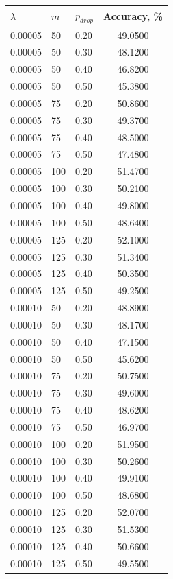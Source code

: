 \documentclass{article}
\begin{document}
\newpage
	\begin{center}	
	\begin{tabular}{|l|l|l|c|}
		\hline
		 $\lambda$ & $m$ & $p_{drop}$ & Accuracy, \% \\\hline
		0.00005 & 50 & 0.20 & 49.0500 \\
		0.00005 & 50 & 0.30 & 48.1200 \\
		0.00005 & 50 & 0.40 & 46.8200 \\
		0.00005 & 50 & 0.50 & 45.3800 \\
		0.00005 & 75 & 0.20 & 50.8600 \\
		0.00005 & 75 & 0.30 & 49.3700 \\
		0.00005 & 75 & 0.40 & 48.5000 \\
		0.00005 & 75 & 0.50 & 47.4800 \\
		0.00005 & 100 & 0.20 & 51.4700 \\
		0.00005 & 100 & 0.30 & 50.2100 \\
		0.00005 & 100 & 0.40 & 49.8000 \\
		0.00005 & 100 & 0.50 & 48.6400 \\
		0.00005 & 125 & 0.20 & 52.1000 \\
		0.00005 & 125 & 0.30 & 51.3400 \\
		0.00005 & 125 & 0.40 & 50.3500 \\
		0.00005 & 125 & 0.50 & 49.2500 \\
		0.00010 & 50 & 0.20 & 48.8900 \\
		0.00010 & 50 & 0.30 & 48.1700 \\
		0.00010 & 50 & 0.40 & 47.1500 \\
		0.00010 & 50 & 0.50 & 45.6200 \\
		0.00010 & 75 & 0.20 & 50.7500 \\
		0.00010 & 75 & 0.30 & 49.6000 \\
		0.00010 & 75 & 0.40 & 48.6200 \\
		0.00010 & 75 & 0.50 & 46.9700 \\
		0.00010 & 100 & 0.20 & 51.9500 \\
		0.00010 & 100 & 0.30 & 50.2600 \\
		0.00010 & 100 & 0.40 & 49.9100 \\
		0.00010 & 100 & 0.50 & 48.6800 \\
		0.00010 & 125 & 0.20 & 52.0700 \\
		0.00010 & 125 & 0.30 & 51.5300 \\
		0.00010 & 125 & 0.40 & 50.6600 \\
		0.00010 & 125 & 0.50 & 49.5500 \\

\end{tabular}
\end{center}
\end{document}
